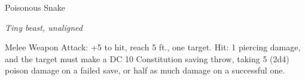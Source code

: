 \begin{monsterbox}{Poisonous Snake}
\begin{hangingpar}
\textit{Tiny beast, unaligned}
\end{hangingpar}
\dndline%
\basics[%
armorclass = 13,
hitpoints = 1d4,
speed = {30 ft., swim 30 ft.}
]
\dndline%
\stats[%
STR = \stat{2},
DEX = \stat{16},
CON = \stat{11},
INT = \stat{1},
WIS = \stat{10},
CHA = \stat{3}
]
\dndline%
\details[%
skills={},
damageimmunities={},
savingthrows={},
conditionimmunities={},
damageresistances={},
damagevulnerabilities={},
senses={blindsight 10 ft., passive Perception 10},
challenge=1/8
]
\dndline%
\begin{monsteraction}[Bite]
Melee Weapon Attack: +5 to hit, reach 5 ft., one target. Hit: 1 piercing damage, and the target must make a DC 10 Constitution saving throw, taking 5 (2d4) poison damage on a failed save, or half as much damage on a successful one.
\end{monsteraction}
\end{monsterbox}